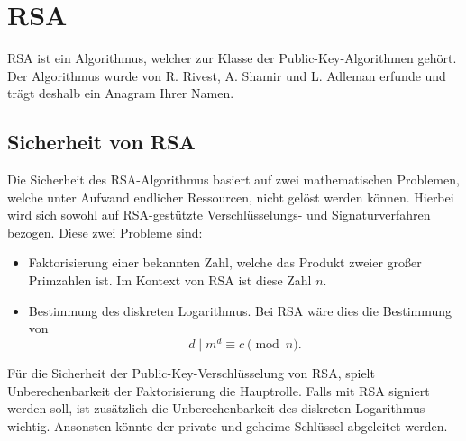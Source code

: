 \chapter{RSA}
\ac{RSA} ist ein Algorithmus, welcher zur Klasse der Public-Key-Algorithmen gehört. Der Algorithmus wurde von R. Rivest, A. Shamir und L. Adleman erfunde und trägt deshalb ein Anagram Ihrer Namen.

\section{Sicherheit von RSA}
Die Sicherheit des RSA-Algorithmus basiert auf zwei mathematischen Problemen, welche unter Aufwand endlicher Ressourcen, nicht gelöst werden können. Hierbei wird sich sowohl auf RSA-gestützte Verschlüsselungs- und Signaturverfahren bezogen.
Diese zwei Probleme sind:
\begin{itemize}
    \item Faktorisierung einer bekannten Zahl, welche das Produkt zweier großer Primzahlen ist. Im Kontext von RSA ist diese Zahl $n$.
    \item Bestimmung des diskreten Logarithmus. Bei RSA wäre dies die Bestimmung von 
    \begin{equation}
        d \mid m^{d} \equiv c \pmod n .
    \end{equation}
\end{itemize}

Für die Sicherheit der Public-Key-Verschlüsselung von RSA, spielt Unberechenbarkeit der Faktorisierung die Hauptrolle. Falls mit RSA signiert werden soll, ist zusätzlich die Unberechenbarkeit des diskreten Logarithmus wichtig. Ansonsten könnte der private und geheime Schlüssel abgeleitet werden.




